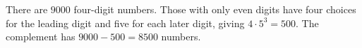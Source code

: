 There are $9000$ four-digit numbers. Those with only even digits have four choices for the leading digit and five for each later digit, giving $4\cdot5^3=500$. The complement has $9000-500=\boxed{8500}$ numbers.
